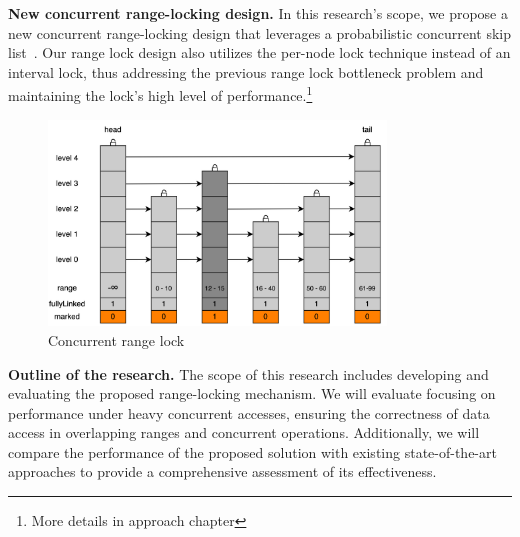 \newpage

\textbf{New concurrent range-locking design.} In this research's scope, we propose a new concurrent range-locking design that leverages a probabilistic concurrent skip list~\parencite{herlihy2006provably, herlihy2020art}. Our range lock design also utilizes the per-node lock technique instead of an interval lock, thus addressing the previous range lock bottleneck problem and maintaining the lock's high level of performance.\footnote{More details in approach chapter}

\begin{figure}[h]
    \centering
    \includegraphics[width=0.8\textwidth]{./figures/concurrent_range_lock.jpg}
    \caption{Concurrent range lock}
    \label{fig:concurrent_range_lock}
\end{figure}

\textbf{Outline of the research.} The scope of this research includes developing and evaluating the proposed range-locking mechanism. We will evaluate focusing on performance under heavy concurrent accesses, ensuring the correctness of data access in overlapping ranges and concurrent operations. Additionally, we will compare the performance of the proposed solution with existing state-of-the-art approaches to provide a comprehensive assessment of its effectiveness.